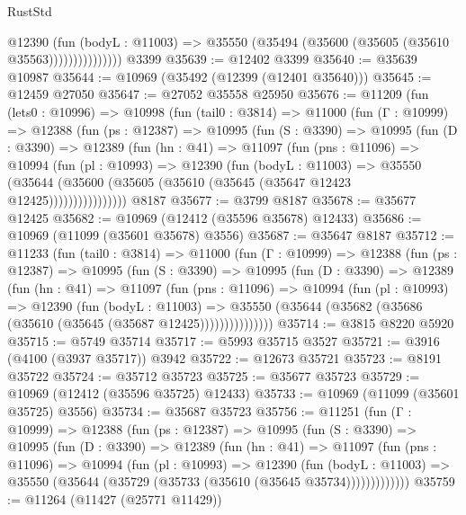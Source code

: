 \begin{lexlean}{RustStd}
\begin{coremodule}
                      @12390
                        (fun (bodyL : @11003) =>
                        @35550 (@35494 (@35600 (@35605 (@35610 @35563)))))))))))))))
    @3399
@35639 := @12402 @3399
@35640 := @35639 @10987
@35644 := @10969 (@35492 (@12399 (@12401 @35640)))
@35645 := @12459 @27050
@35647 := @27052 @35558 @25950
@35676 := @11209
    (fun (lets0 : @10996) =>
    @10998
      (fun (tail0 : @3814) =>
      @11000
        (fun (Γ : @10999) =>
        @12388
          (fun (ps : @12387) =>
          @10995
            (fun (S : @3390) =>
            @10995
              (fun (D : @3390) =>
              @12389
                (fun (hn : @41) =>
                @11097
                  (fun (pns : @11096) =>
                  @10994
                    (fun (pl : @10993) =>
                    @12390
                      (fun (bodyL : @11003) =>
                      @35550
                        (@35644
                          (@35600 (@35605 (@35610 (@35645 (@35647 @12423 @12425))))))))))))))))
    @8187
@35677 := @3799 @8187
@35678 := @35677 @12425
@35682 := @10969 (@12412 (@35596 @35678) @12433)
@35686 := @10969 (@11099 (@35601 @35678) @3556)
@35687 := @35647 @8187
@35712 := @11233
    (fun (tail0 : @3814) =>
    @11000
      (fun (Γ : @10999) =>
      @12388
        (fun (ps : @12387) =>
        @10995
          (fun (S : @3390) =>
          @10995
            (fun (D : @3390) =>
            @12389
              (fun (hn : @41) =>
              @11097
                (fun (pns : @11096) =>
                @10994
                  (fun (pl : @10993) =>
                  @12390
                    (fun (bodyL : @11003) =>
                    @35550 (@35644 (@35682 (@35686 (@35610 (@35645 (@35687 @12425)))))))))))))))
@35714 := @3815 @8220 @5920
@35715 := @5749 @35714
@35717 := @5993 @35715 @3527
@35721 := @3916 (@4100 (@3937 @35717)) @3942
@35722 := @12673 @35721
@35723 := @8191 @35722
@35724 := @35712 @35723
@35725 := @35677 @35723
@35729 := @10969 (@12412 (@35596 @35725) @12433)
@35733 := @10969 (@11099 (@35601 @35725) @3556)
@35734 := @35687 @35723
@35756 := @11251
    (fun (Γ : @10999) =>
    @12388
      (fun (ps : @12387) =>
      @10995
        (fun (S : @3390) =>
        @10995
          (fun (D : @3390) =>
          @12389
            (fun (hn : @41) =>
            @11097
              (fun (pns : @11096) =>
              @10994
                (fun (pl : @10993) =>
                @12390
                  (fun (bodyL : @11003) =>
                  @35550 (@35644 (@35729 (@35733 (@35610 (@35645 @35734)))))))))))))
@35759 := @11264 (@11427 (@25771 @11429))

\end{coremodule}
\end{lexlean}
